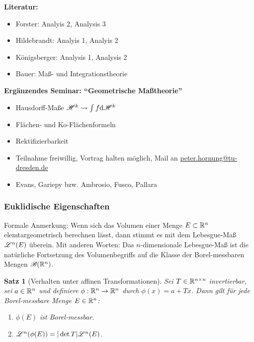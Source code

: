 \documentclass[
 a4paper,
 12pt,
 parskip=half
 ]{scrartcl}
\theoremstyle{plain}
\newtheorem*{thm*}{Satz}
\theoremstyle{definition}
\numberwithin{equation}{section}
\begin{document}
\textbf{Literatur:}
\begin{itemize}
 \item Forster: Analyis 2, Analysis 3
 \item Hildebrandt: Analyis 1, Analyis 2
 \item Königsberger: Analysis 1, Analysis 2
 \item Bauer: Maß- und Integrationstheorie
\end{itemize}

\textbf{Ergänzendes Seminar: ``Geometrische Maßtheorie''}
\begin{itemize}
 \item Hausdorff-Maße $\mathscr{H}^k \rightsquigarrow \int f \mathrm{d} \mathscr{H}^k$
 \item Flächen- und Ko-Flächenformeln
 \item Rektifizierbarkeit
 \item Teilnahme freiwillig, Vortrag halten möglich, Mail an \href{mailto:peter.hornung@tu-dresden.de}{peter.hornung@tu-dresden.de}
 \item Evans, Gariepy bzw. Ambrosio, Fusco, Pallara
\end{itemize}

\subsubsection{Euklidische Eigenschaften}
Formale Anmerkung: Wenn sich das Volumen einer Menge $E \subset \mathbb{R}^n$ elemtargeometrisch berechnen lässt, dann stimmt es mit dem Lebesgue-Maß $\mathscr{L}^n(E)$ überein. Mit anderen Worten: Das $n$-dimensionale Lebesgue-Maß ist die natürliche Fortsetzung des Volumenbegriffs auf die Klasse der Borel-messbaren Mengen $\mathscr{B}(\mathbb{R}^n)$.

\begin{thm*}[Verhalten unter affinen Transformationen]
 Sei $T \in \mathbb{R}^{n \times n}$ invertierbar, sei $a \in \mathbb{R}^n$ und definiere $\phi:\mathbb{R}^n \to \mathbb{R}^n$ durch $\phi(x) = a + Tx$. Dann gilt für jede Borel-messbare Menge $E \in \mathbb{R}^n$:
 \begin{enumerate}
  \item $\phi(E)$ ist Borel-messbar.
  \item $\mathscr{L}^n( \phi(E) ) = | \det T | \mathscr{L}^n (E)$.
 \end{enumerate}
\end{thm*}
\end{document}
